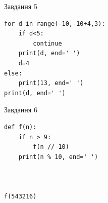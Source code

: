 \documentclass[12pt, ukrainian]{article}
\begin{document}
{\vspace{15mm}
\begin{minipage}[t]{9.7cm}                
{\begin{center}Завдання {5}\end{center}}
\begin{verbatim}
for d in range(-10,-10+4,3):
    if d<5:
        continue
    print(d, end=' ')
    d=4
else:
    print(13, end=' ')
print(d, end=' ')
\end{verbatim}     
\end{minipage}
\vline \hspace{8mm}
\begin{minipage}[t]{8.0cm}                
{\begin{center}Завдання {6}\end{center}}
\begin{verbatim}
def f(n):
    if n > 9:
        f(n // 10)
    print(n % 10, end=' ')
    


f(543216)
\end{verbatim}     
\end{minipage}

}
\newpage
\end{document}
